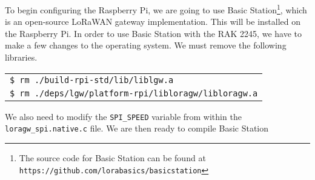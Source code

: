 To begin configuring the Raspberry Pi, we are going to use Basic Station\footnote{The source code for Basic Station can be found at \texttt{https://github.com/lorabasics/basicstation}}, which is an open-source LoRaWAN gateway implementation. This will be installed on the Raspberry Pi. In order to use Basic Station with the RAK 2245, we have to make a few changes to the operating system. We must remove the following libraries.

\begin{tabular}{l}
     \texttt{\$ rm ./build-rpi-std/lib/liblgw.a} \\
     \texttt{\$ rm ./deps/lgw/platform-rpi/libloragw/libloragw.a} \\
\end{tabular}

We also need to modify the \texttt{SPI\_SPEED} variable from within the \texttt{loragw_spi.native.c} file. We are then ready to compile Basic Station
